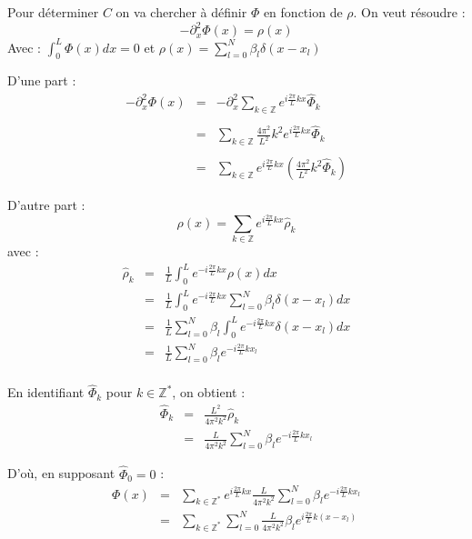 \documentclass[a4paper,11pt]{article}
\begin{document}
Pour déterminer $C$ on va chercher à définir $\Phi$ en fonction de $\rho$.
On veut résoudre :
$$
- \partial ^2 _x \Phi(x) = \rho (x)
$$
Avec : $\int _0 ^L \Phi(x) dx = 0$ et $\rho (x) = \sum\limits_{l=0} ^N \beta_l \delta(x - x_l)$

D'une part :
$$
\begin{array}{rcl}
- \partial ^2 _x \Phi(x) &=& - \partial ^2 _x \sum\limits_{k \in \mathbb{Z}} e^{i\frac{2 \pi}{L} kx} \widehat{\Phi}_k \\ \\
 &=& \sum\limits_{k \in \mathbb{Z}} \frac{4 \pi^2}{L^2}k^2 e^{i\frac{2 \pi}{L} kx} \widehat{\Phi}_k \\ \\
 &=& \sum\limits_{k \in \mathbb{Z}} e^{i\frac{2 \pi}{L} kx} (\frac{4 \pi^2}{L^2}k^2  \widehat{\Phi}_k) 
\end{array}
$$

D'autre part :
$$
\rho(x) = \sum\limits_{k \in \mathbb{Z}} e^{i\frac{2 \pi}{L} kx} \widehat{\rho}_k
$$
avec :
$$
\begin{array}{rcl}
\widehat{\rho}_k &=& \frac{1}{L} \int_0 ^L e^{-i\frac{2 \pi}{L} kx} \rho(x) dx \\
 &=& \frac{1}{L} \int_0 ^L e^{-i\frac{2 \pi}{L} kx} \sum\limits_{l=0} ^N \beta_l \delta(x - x_l) dx \\
 &=& \frac{1}{L} \sum\limits_{l=0} ^N \beta_l \int_0 ^L e^{-i\frac{2 \pi}{L} kx} \delta(x - x_l) dx \\
 &=& \frac{1}{L} \sum\limits_{l=0} ^N \beta_l e^{-i\frac{2 \pi}{L} kx_l} \\
\end{array}
$$

En identifiant $\widehat{\Phi}_k$ pour $k \in \mathbb{Z}^*$, on obtient :
$$
\begin{array}{rcl}
\widehat{\Phi}_k &=& \frac{L^2}{4 \pi^2 k^2} \widehat{\rho}_k \\
 &=& \frac{L}{4 \pi^2 k^2} \sum\limits_{l=0} ^N \beta_l e^{-i\frac{2 \pi}{L} kx_l}
\end{array}
$$

D'où, en supposant $\widehat{\Phi}_0 = 0$ : 
$$
\begin{array}{rcl}
\Phi(x) &=& \sum\limits_{k \in \mathbb{Z}^*} e^{i\frac{2 \pi}{L} kx} \frac{L}{4 \pi^2 k^2} \sum\limits_{l=0} ^N \beta_l e^{-i\frac{2 \pi}{L} kx_l} \\
 &=& \sum\limits_{k \in \mathbb{Z}^*} \sum\limits_{l=0} ^N \frac{L}{4 \pi^2 k^2} \beta_l e^{i\frac{2 \pi}{L} k( x -x_l)}
\end{array}
$$
\end{document}

